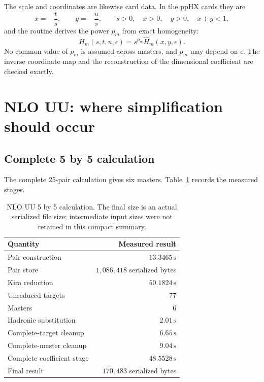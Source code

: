 \documentclass[11pt]{article}
\newcommand{\eps}{\epsilon}
\newcommand{\Sec}{\,\mathrm{s}}
\begin{document}
The scale and coordinates are likewise card data.  In the ppHX cards they are
\begin{equation}
  x=-\frac{t}{s},\qquad y=-\frac{u}{s},
  \qquad s>0,\quad x>0,\quad y>0,\quad x+y<1,
  \label{eq:dimensionless}
\end{equation}
and the routine derives the power $p_m$ from exact homogeneity:
\begin{equation}
  H_m(s,t,u,\eps)=s^{p_m}\widehat H_m(x,y,\eps).
\end{equation}
No common value of $p_m$ is assumed across masters, and $p_m$ may depend on
$\eps$.  The inverse coordinate map and the reconstruction of the dimensional
coefficient are checked exactly.

\section{NLO UU: where simplification should occur}

\subsection{Complete 5 by 5 calculation}

The complete 25-pair calculation gives six masters.  Table~\ref{tab:nlo5}
records the measured stages.

\begin{table}[ht]
\centering
\caption{NLO UU 5 by 5 calculation.  The final size is an actual serialized
file size; intermediate input sizes were not retained in this compact
summary.}
\label{tab:nlo5}
\begin{tabular}{@{}lr@{}}
\toprule
Quantity & Measured result \\
\midrule
Pair construction & $13.3465\Sec$ \\
Pair store & $1{,}086{,}418$ serialized bytes \\
Kira reduction & $50.1824\Sec$ \\
Unreduced targets & $77$ \\
Masters & $6$ \\
Hadronic substitution & $2.01\Sec$ \\
Complete-target cleanup & $6.65\Sec$ \\
Complete-master cleanup & $9.04\Sec$ \\
Complete coefficient stage & $48.5528\Sec$ \\
Final result & $170{,}483$ serialized bytes \\
\bottomrule
\end{tabular}
\end{table}
\end{document}
